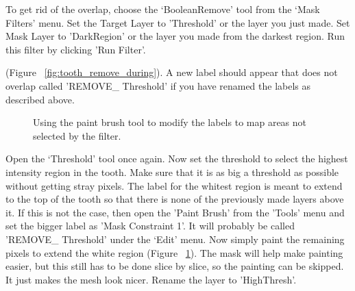 \documentclass[fleqn,12pt,openany]{book}
\begin{document}
To get rid of the overlap, choose the `BooleanRemove' 
tool from the `Mask Filters' menu.  Set the Target Layer to 'Threshold' or the layer you just made. Set Mask Layer to 'DarkRegion' or the layer you made from the darkest region.  Run this filter by clicking 'Run Filter'.

(Figure ~\ref{fig:tooth_remove_during}).  A new label should appear that does
not overlap called 'REMOVE\_ Threshold' if you have renamed the labels as described above.  

\begin{figure}
\caption{\label{fig:tooth_paint}  Using the paint brush tool to modify the labels to map areas not selected by the filter.}
\end{figure} 

Open the `Threshold' tool once again.  Now set the threshold to select the 
highest intensity  region in the tooth.  Make sure that it is as big a 
threshold as possible without getting stray pixels.  The label for the whitest 
region is meant to extend to the top of the tooth so that there is none of the 
previously made layers above it.  If this is not the case, then open the 'Paint Brush'
from the 'Tools' menu and set the 
bigger label as 'Mask Constraint 1'.  It will probably be called 'REMOVE\_ Threshold'
under the `Edit' menu.  Now simply paint the remaining pixels to extend the white region 
(Figure ~\ref{fig:tooth_paint}).  The mask will help make painting easier, 
but this still has to be done slice by slice, so the painting can be skipped.  
It just makes the mesh look nicer.  Rename the layer to 'HighThresh'.
\end{document}
